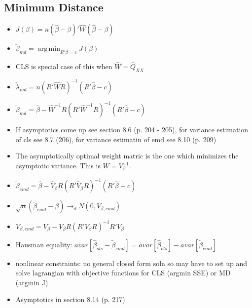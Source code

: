 \documentclass[11pt]{article} %
\DeclareMathOperator*{\argmin}{arg\,min}
\begin{document}
\subsection{Minimum Distance}
\begin{itemize}
\item $J(\beta) = n (\hat{\beta} - \beta)'\hat{W}(\hat{\beta} - \beta)$
\item $\tilde{\beta}_{md} = \argmin_{R'\beta = c}J(\beta)$
\item CLS is special case of this when $\hat{W} = \hat{Q}_{XX}$
\item $\tilde{\lambda}_{md} = n(R'\hat{W}R)^{-1} (R'\hat{\beta} - c) $
\item $\tilde{\beta}_{md} = \hat{\beta} - \hat{W}^{-1}R(R'\hat{W}^{-1} R)^{-1} (R'\hat{\beta} - c)$
\item If asymptotics come up see section 8.6 (p. 204 - 205), for variance estimation of cls see 8.7 (206), for variance estimatin of emd see 8.10 (p. 209)
\item The asymptotically optimal weight matric is the one which minimizes the asymptotic variance. This is $W = V_{\beta}^{-1}$.
\item $\tilde{\beta}_{emd} = \hat{\beta} - \hat{V}_{\beta} R (R'\hat{V}_{\beta} R)^{-1} (R'\hat{\beta} - c)$
\item $\sqrt{n}(\tilde{\beta}_{emd} - \beta) \rightarrow_d N(0,V_{\beta,emd})$
\item $V_{\beta,emd} = V_{\beta} - V_{\beta}R(R'V_{\beta}R)^{-1}R'V_{\beta}$
\item Hausman equality: $avar[\hat{\beta}_{ols} - \tilde{\beta}_{emd}] = avar[\hat{\beta}_{ols}] - avar[\tilde{\beta}_{emd}]$
\item nonlinear constraints: no general closed form soln so may have to set up and solve lagrangian with objective functions for CLS (argmin SSE) or MD (argmin J)
\item Asymptotics in section 8.14 (p. 217)
\end{itemize}
\end{document}
